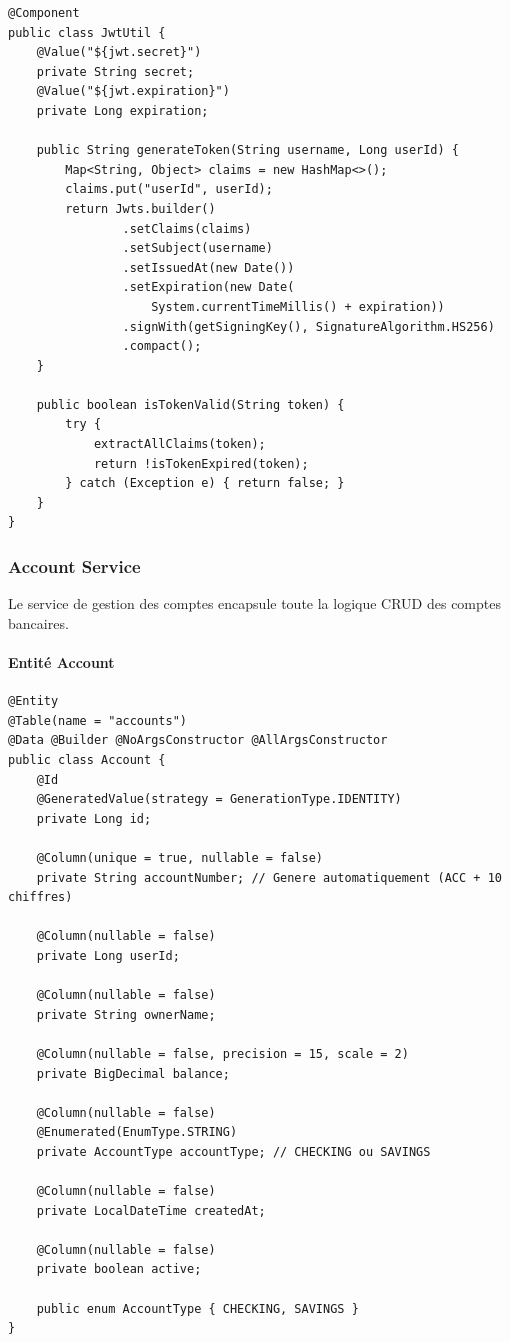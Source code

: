 \documentclass[12pt,a4paper]{article}
\begin{document}
\begin{lstlisting}[style=javastyle, caption={JwtUtil.java --- Génération et validation des jetons JWT}, label=lst:jwt]
@Component
public class JwtUtil {
    @Value("${jwt.secret}")
    private String secret;
    @Value("${jwt.expiration}")
    private Long expiration;

    public String generateToken(String username, Long userId) {
        Map<String, Object> claims = new HashMap<>();
        claims.put("userId", userId);
        return Jwts.builder()
                .setClaims(claims)
                .setSubject(username)
                .setIssuedAt(new Date())
                .setExpiration(new Date(
                    System.currentTimeMillis() + expiration))
                .signWith(getSigningKey(), SignatureAlgorithm.HS256)
                .compact();
    }

    public boolean isTokenValid(String token) {
        try {
            extractAllClaims(token);
            return !isTokenExpired(token);
        } catch (Exception e) { return false; }
    }
}
\end{lstlisting}

\subsubsection{Account Service}

Le service de gestion des comptes encapsule toute la logique CRUD des comptes bancaires.

\paragraph{Entité Account}

\begin{lstlisting}[style=javastyle, caption={Account.java --- Entité JPA représentant un compte bancaire}, label=lst:account]
@Entity
@Table(name = "accounts")
@Data @Builder @NoArgsConstructor @AllArgsConstructor
public class Account {
    @Id
    @GeneratedValue(strategy = GenerationType.IDENTITY)
    private Long id;

    @Column(unique = true, nullable = false)
    private String accountNumber; // Genere automatiquement (ACC + 10 chiffres)

    @Column(nullable = false)
    private Long userId;

    @Column(nullable = false)
    private String ownerName;

    @Column(nullable = false, precision = 15, scale = 2)
    private BigDecimal balance;

    @Column(nullable = false)
    @Enumerated(EnumType.STRING)
    private AccountType accountType; // CHECKING ou SAVINGS

    @Column(nullable = false)
    private LocalDateTime createdAt;

    @Column(nullable = false)
    private boolean active;

    public enum AccountType { CHECKING, SAVINGS }
}
\end{lstlisting}
\end{document}
